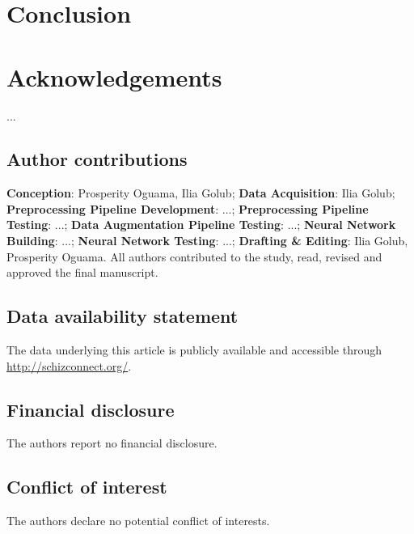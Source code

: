 

\section{Conclusion}

\lipsum[9-10]



\section*{Acknowledgements}

...

\subsection*{Author contributions}

\textbf{Conception}: Prosperity Oguama, Ilia Golub; \textbf{Data Acquisition}: Ilia Golub; \textbf{Preprocessing Pipeline Development}: ...; \textbf{Preprocessing Pipeline Testing}: ...; \textbf{Data Augmentation Pipeline Testing}: ...; \textbf{Neural Network Building}: ...; \textbf{Neural Network Testing}: ...; \textbf{Drafting \& Editing}: Ilia Golub, Prosperity Oguama. All authors contributed to the study, read, revised and approved the final manuscript.

\subsection*{Data availability statement}
The data underlying this article is publicly available and accessible through \hyperlink{Schizconnect}{http://schizconnect.org/}.

\subsection*{Financial disclosure}

The authors report no financial disclosure.

\subsection*{Conflict of interest}

The authors declare no potential conflict of interests.

\renewcommand{\baselinestretch}{1.5} %
\cleardoublepage    %



